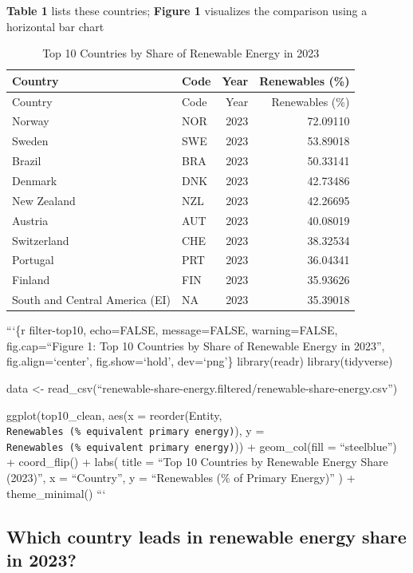 \documentclass[
  letterpaper,
  DIV=11,
  numbers=noendperiod]{scrartcl}
\begin{document}
\textbf{Table 1} lists these countries; \textbf{Figure 1} visualizes the
comparison using a horizontal bar chart

\begin{longtable}[]{@{}llrr@{}}
\caption{Top 10 Countries by Share of Renewable Energy in
2023}\tabularnewline
\toprule\noalign{}
Country & Code & Year & Renewables (\%) \\
\midrule\noalign{}
\endfirsthead
\toprule\noalign{}
Country & Code & Year & Renewables (\%) \\
\midrule\noalign{}
\endhead
\bottomrule\noalign{}
\endlastfoot
Norway & NOR & 2023 & 72.09110 \\
Sweden & SWE & 2023 & 53.89018 \\
Brazil & BRA & 2023 & 50.33141 \\
Denmark & DNK & 2023 & 42.73486 \\
New Zealand & NZL & 2023 & 42.26695 \\
Austria & AUT & 2023 & 40.08019 \\
Switzerland & CHE & 2023 & 38.32534 \\
Portugal & PRT & 2023 & 36.04341 \\
Finland & FIN & 2023 & 35.93626 \\
South and Central America (EI) & NA & 2023 & 35.39018 \\
\end{longtable}

```\{r filter-top10, echo=FALSE, message=FALSE, warning=FALSE,
fig.cap=``Figure 1: Top 10 Countries by Share of Renewable Energy in
2023'', fig.align=`center', fig.show=`hold', dev=`png'\} library(readr)
library(tidyverse)

data \textless-
read\_csv(``renewable-share-energy.filtered/renewable-share-energy.csv'')

ggplot(top10\_clean, aes(x = reorder(Entity,
\texttt{Renewables\ (\%\ equivalent\ primary\ energy)}), y =
\texttt{Renewables\ (\%\ equivalent\ primary\ energy)})) +
geom\_col(fill = ``steelblue'') + coord\_flip() + labs( title = ``Top 10
Countries by Renewable Energy Share (2023)'', x = ``Country'', y =
``Renewables (\% of Primary Energy)'' ) + theme\_minimal() ```

\subsection{Which country leads in renewable energy share in
2023?}\label{which-country-leads-in-renewable-energy-share-in-2023}
\end{document}
